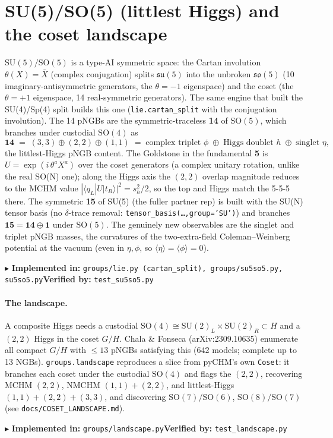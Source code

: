 \documentclass[11pt]{article}
\newcommand{\so}[1]{\mathfrak{so}(#1)}
\newcommand{\SO}[1]{\mathrm{SO}(#1)}
\newcommand{\SU}[1]{\mathrm{SU}(#1)}
\newcommand{\sh}{s_h}
\newcommand{\code}[1]{\texttt{#1}}
\newcommand{\impl}[2]{\par\smallskip\noindent\textcolor{blue!60!black}{\small$\blacktriangleright$ \textbf{Implemented in:} \code{#1}\quad\textbf{Verified by:} \code{#2}}\par\smallskip}
\begin{document}
\section{SU(5)/SO(5) (littlest Higgs) and the coset landscape}
\label{sec:su5}
$\SU5/\SO5$ is a type-AI symmetric space: the Cartan involution $\theta(X)=\bar X$ (complex
conjugation) splits $\mathfrak{su}(5)$ into the unbroken $\so5$ (10 imaginary-antisymmetric
generators, the $\theta=-1$ eigenspace) and the coset (the $\theta=+1$ eigenspace, 14 real-symmetric
generators). The same engine that built the SU(4)/Sp(4) split builds this one
(\code{lie.cartan\_split} with the conjugation involution). The 14 pNGBs are the symmetric-traceless
\textbf{14} of $\SO5$, which branches under custodial $\SO4$ as
\begin{equation}
  \mathbf{14}\;=\;(3,3)\oplus(2,2)\oplus(1,1)\;=\;\text{complex triplet }\phi\;\oplus\;\text{Higgs doublet }h\;\oplus\;\text{singlet }\eta,
\end{equation}
the littlest-Higgs pNGB content. The Goldstone in the fundamental \textbf{5} is $U=\exp(i\,\theta^a
X^a)$ over the coset generators (a complex unitary rotation, unlike the real SO(N) one); along the
Higgs axis the $(2,2)$ overlap magnitude reduces to the MCHM value
$|\langle q_L|U|t_R\rangle|^2=\sh^2/2$, so the top and Higgs match the 5-5-5 there. The symmetric
\textbf{15} of SU(5) (the fuller partner rep) is built with the SU(N) tensor basis (no
$\delta$-trace removal: \code{tensor\_basis(\dots,group='SU')}) and branches $\mathbf{15}=\mathbf{14}
\oplus\mathbf 1$ under $\SO5$. The genuinely new observables are the singlet and triplet pNGB masses,
the curvatures of the two-extra-field Coleman--Weinberg potential at the vacuum (even in $\eta,\phi$,
so $\langle\eta\rangle=\langle\phi\rangle=0$).
\impl{groups/lie.py (cartan\_split), groups/su5so5.py, su5so5.py}{test\_su5so5.py}

\paragraph{The landscape.} A composite Higgs needs a custodial $\SO4\cong\SU2_L\times\SU2_R\subset H$
and a $(2,2)$ Higgs in the coset $G/H$. Chala \& Fonseca (arXiv:2309.10635) enumerate all compact
$G/H$ with $\le13$ pNGBs satisfying this (642 models; complete up to 13 NGBs). \code{groups.landscape}
reproduces a slice from pyCHM's own \code{Coset}: it branches each coset under the custodial $\SO4$
and flags the $(2,2)$, recovering MCHM $(2,2)$, NMCHM $(1,1)+(2,2)$, and littlest-Higgs
$(1,1)+(2,2)+(3,3)$, and discovering $\SO7/\SO6$, $\SO8/\SO7$ (see \code{docs/COSET\_LANDSCAPE.md}).
\impl{groups/landscape.py}{test\_landscape.py}
\end{document}
